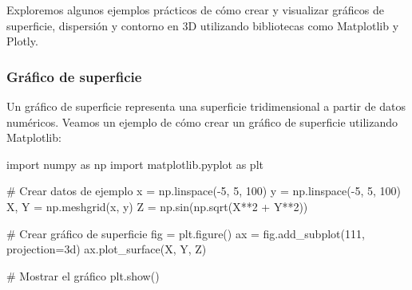 \documentclass[
  a4paper,
]{article}
\newenvironment{Shaded}{}{}
\newcommand{\CommentTok}[1]{\textcolor[rgb]{0.42,0.45,0.49}{#1}}
\newcommand{\DecValTok}[1]{\textcolor[rgb]{0.00,0.36,0.77}{#1}}
\newcommand{\ImportTok}[1]{\textcolor[rgb]{0.01,0.18,0.38}{#1}}
\newcommand{\NormalTok}[1]{\textcolor[rgb]{0.14,0.16,0.18}{#1}}
\newcommand{\OperatorTok}[1]{\textcolor[rgb]{0.14,0.16,0.18}{#1}}
\newcommand{\StringTok}[1]{\textcolor[rgb]{0.01,0.18,0.38}{#1}}
\begin{document}
Exploremos algunos ejemplos prácticos de cómo crear y visualizar
gráficos de superficie, dispersión y contorno en 3D utilizando
bibliotecas como Matplotlib y Plotly.

\hypertarget{gruxe1fico-de-superficie}{%
\subsubsection{Gráfico de superficie}\label{gruxe1fico-de-superficie}}

Un gráfico de superficie representa una superficie tridimensional a
partir de datos numéricos. Veamos un ejemplo de cómo crear un gráfico de
superficie utilizando Matplotlib:

\begin{Shaded}
\begin{Highlighting}[]
\ImportTok{import}\NormalTok{ numpy }\ImportTok{as}\NormalTok{ np}
\ImportTok{import}\NormalTok{ matplotlib.pyplot }\ImportTok{as}\NormalTok{ plt}

\CommentTok{\# Crear datos de ejemplo}
\NormalTok{x }\OperatorTok{=}\NormalTok{ np.linspace(}\OperatorTok{{-}}\DecValTok{5}\NormalTok{, }\DecValTok{5}\NormalTok{, }\DecValTok{100}\NormalTok{)}
\NormalTok{y }\OperatorTok{=}\NormalTok{ np.linspace(}\OperatorTok{{-}}\DecValTok{5}\NormalTok{, }\DecValTok{5}\NormalTok{, }\DecValTok{100}\NormalTok{)}
\NormalTok{X, Y }\OperatorTok{=}\NormalTok{ np.meshgrid(x, y)}
\NormalTok{Z }\OperatorTok{=}\NormalTok{ np.sin(np.sqrt(X}\OperatorTok{**}\DecValTok{2} \OperatorTok{+}\NormalTok{ Y}\OperatorTok{**}\DecValTok{2}\NormalTok{))}

\CommentTok{\# Crear gráfico de superficie}
\NormalTok{fig }\OperatorTok{=}\NormalTok{ plt.figure()}
\NormalTok{ax }\OperatorTok{=}\NormalTok{ fig.add\_subplot(}\DecValTok{111}\NormalTok{, projection}\OperatorTok{=}\StringTok{\textquotesingle{}3d\textquotesingle{}}\NormalTok{)}
\NormalTok{ax.plot\_surface(X, Y, Z)}

\CommentTok{\# Mostrar el gráfico}
\NormalTok{plt.show()}
\end{Highlighting}
\end{Shaded}
\end{document}
